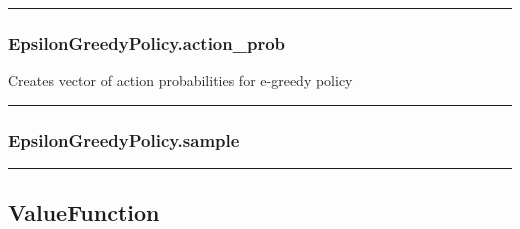 \begin{Shaded}
\begin{Highlighting}[]
\end{Highlighting}
\end{Shaded}

\begin{center}\rule{0.5\linewidth}{\linethickness}\end{center}

\hypertarget{epsilongreedypolicy.action_prob}{%
\subsubsection{EpsilonGreedyPolicy.action\_prob}\label{epsilongreedypolicy.action_prob}}

\begin{Shaded}
\begin{Highlighting}[]
\end{Highlighting}
\end{Shaded}

Creates vector of action probabilities for e-greedy policy

\begin{center}\rule{0.5\linewidth}{\linethickness}\end{center}

\hypertarget{epsilongreedypolicy.sample}{%
\subsubsection{EpsilonGreedyPolicy.sample}\label{epsilongreedypolicy.sample}}

\begin{Shaded}
\begin{Highlighting}[]
\end{Highlighting}
\end{Shaded}

\begin{center}\rule{0.5\linewidth}{\linethickness}\end{center}

\hypertarget{valuefunction}{%
\subsection{ValueFunction}\label{valuefunction}}

